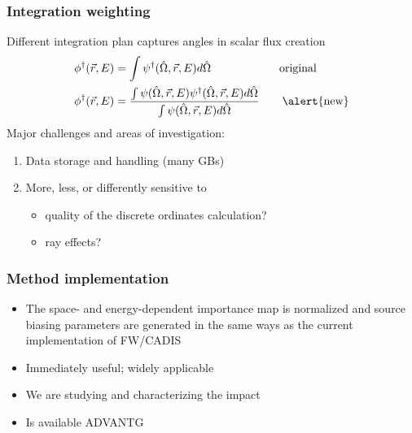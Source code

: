 \documentclass[xcolor=x11names,compress,handout]{beamer}
\renewcommand{\(}{\begin{columns}}
\renewcommand{\)}{\end{columns}}
\newcommand{\<}[1]{\begin{column}{#1}}
\renewcommand{\>}{\end{column}}
\newcommand{\vOmega}{\ensuremath{\hat{\Omega}}}
\newcommand{\ve}[1]{\ensuremath{\vec{#1}}}
\begin{document}
\begin{frame}[fragile]
  \frametitle{Integration weighting}

    Different integration plan captures angles in scalar flux creation	
	\begin{align*}
		\phi^{\dagger}(\ve{r},E) &= \int \psi^{\dagger}(\vOmega, 
		\ve{r},E) d\vOmega \qquad  \qquad \qquad \text{original}\\
		\phi^{\dagger}(\ve{r},E) &= \frac{\int \psi(\vOmega, \ve{r},E)
		 \psi^{\dagger}(\vOmega, \ve{r},E) d\vOmega}{\int \psi(\vOmega, 
		 \ve{r},E)  d\vOmega} \qquad \text{\alert{new}}
	\end{align*}
    \pause
    Major challenges and areas of investigation:
	\begin{enumerate}
	\item Data storage and handling (many GBs)
	\item More, less, or differently sensitive to 
	  \begin{itemize}
	  \item quality of the discrete ordinates calculation?
	  \item ray effects?
	  \end{itemize}
	\end{enumerate}

\end{frame}


\begin{frame}[fragile]
  \frametitle{Method implementation}

  	\begin{itemize}
    \item The space- and energy-dependent importance map is normalized and 
     source biasing parameters are generated in the \alert{same ways} as
     the current implementation of FW/CADIS \vspace*{1 em}
	\item Immediately useful; widely applicable \vspace*{1 em}
	\item We are studying and characterizing the impact\vspace*{1 em}
	\item Is available ADVANTG \cite{mosher_new_2010}
	\end{itemize}
	
\end{frame}
\end{document}
